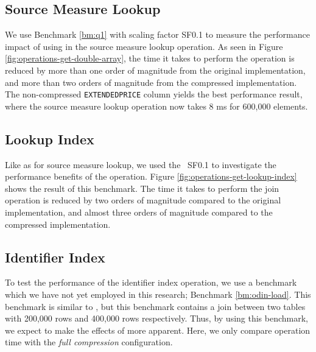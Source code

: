 \subsection{Source Measure Lookup}
\label{sub:Source Measure Lookup}

We use Benchmark \ref{bm:q1} with scaling factor SF0.1 to measure the performance impact of using  in the source measure lookup operation. As seen in Figure \ref{fig:operations-get-double-array}, the time it takes to perform the operation is reduced by more than one order of magnitude from the original implementation, and more than two orders of magnitude from the compressed implementation. The non-compressed \texttt{EXTENDEDPRICE} column yields the best performance result, where the source measure lookup operation now takes 8 ms for 600,000 elements.

\subsection{Lookup Index}
\label{sub:Lookup Index}


Like as for source measure lookup, we used the \tpchdl~SF0.1 to investigate the performance benefits of the  operation. Figure \ref{fig:operations-get-lookup-index} shows the result of this benchmark. The time it takes to perform the join operation is reduced by two orders of magnitude compared to the original implementation, and almost three orders of magnitude compared to the compressed implementation.

\subsection{Identifier Index}
\label{sub:Identifier Index}
To test the performance of the identifier index operation, we use a benchmark which we have not yet employed in this research; Benchmark \ref{bm:odin-load}. This benchmark is similar to \tpchdl, but this benchmark contains a join between two tables with 200,000 rows and 400,000 rows respectively. Thus, by using this benchmark, we expect to make the effects of  more apparent. Here, we only compare operation time with the \textit{full compression} configuration.

